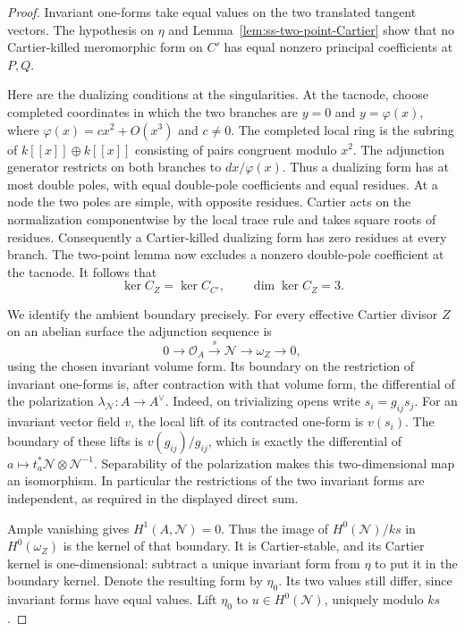 \begin{proof}
Invariant one-forms take equal values on the two translated tangent
vectors. The hypothesis on $\eta$ and
Lemma~\ref{lem:ss-two-point-Cartier} show that no
Cartier-killed meromorphic form on $C'$ has equal nonzero
principal coefficients at $P,Q$.

Here are the dualizing conditions at the singularities. At the
tacnode, choose completed coordinates in which the two branches
are $y=0$ and $y=\varphi(x)$, where
$\varphi(x)=c x^2+O(x^3)$ and $c\ne0$.
The completed local ring is the subring of
$k[[x]]\oplus k[[x]]$ consisting of pairs congruent modulo $x^2$.
The adjunction generator restricts on both branches to
$dx/\varphi(x)$. Thus a dualizing form has at most double poles,
with equal double-pole coefficients and equal residues.
At a node the two poles are simple, with opposite residues.
Cartier acts on the normalization componentwise by the local trace
rule and takes square roots of residues. Consequently a
Cartier-killed dualizing form has zero residues at every branch.
The two-point lemma now excludes a nonzero double-pole coefficient
at the tacnode. It follows that
\[
             \ker C_Z=\ker C_{C'},\qquad \dim\ker C_Z=3.
\]

We identify the ambient boundary precisely. For every effective
Cartier divisor $Z$ on an abelian surface the adjunction sequence is
\[
 0\longrightarrow\mathcal O_A\xrightarrow{s}\mathcal N
 \longrightarrow\omega_Z\longrightarrow0,
\]
using the chosen invariant volume form. Its boundary on the
restriction of invariant one-forms is, after contraction with that
volume form, the differential of the polarization
$\lambda_{\mathcal N}:A\to A^\vee$.
Indeed, on trivializing opens write $s_i=g_{ij}s_j$. For an invariant
vector field $v$, the local lift of its contracted one-form is
$v(s_i)$. The boundary of these lifts is
$v(g_{ij})/g_{ij}$, which is exactly the differential of
$a\mapsto t_a^*\mathcal N\otimes\mathcal N^{-1}$.
Separability of the polarization makes this two-dimensional map
an isomorphism. In particular the restrictions of the two invariant
forms are independent, as required in the displayed direct sum.

Ample vanishing gives $H^1(A,\mathcal N)=0$. Thus the image of
$H^0(\mathcal N)/ks$ in $H^0(\omega_Z)$ is the kernel of that
boundary. It is Cartier-stable, and its Cartier kernel is
one-dimensional: subtract a unique invariant form from $\eta$
to put it in the boundary kernel. Denote the resulting form by
$\eta_0$. Its two values still differ, since invariant forms have
equal values. Lift $\eta_0$ to $u\in H^0(\mathcal N)$, uniquely
modulo $ks$.


\end{proof}
